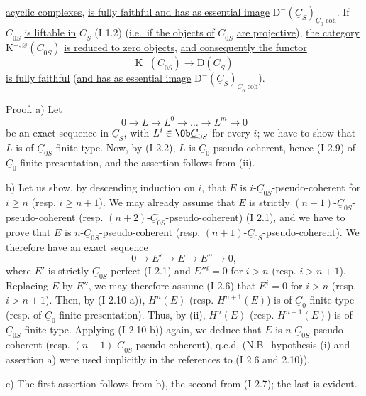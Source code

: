 \begin{enumerate}[label=\alph*)]
%
\uline{acyclic complexes}, \uline{is fully faithful and has as essential image} $\mathrm D^{-}(\underline{C}_S)_{\underline{C}_0\text{-coh}}$. If $\underline{C}_{0S}$ \uline{is liftable in} $\underline{C}_S$ (I 1.2) (\uline{i.e.\ if the objects of} $\underline{C}_{0S}$ \uline{are projective}), \uline{the category} $\mathrm K^{-,\varnothing}(\underline{C}_{0S})$ \uline{is reduced to zero objects}, \uline{and consequently the functor}
\[
\mathrm K^{-}(\underline{C}_{0S})\longrightarrow \mathrm D(\underline{C}_S)
\]
\uline{is fully faithful} (\uline{and has as essential image} $\mathrm D^{-}(\underline{C}_S)_{\underline{C}_0\text{-coh}}$).
\end{enumerate}

\uline{Proof.} a) Let
\[
0\longrightarrow L\longrightarrow L^0\longrightarrow\ldots\longrightarrow L^m\longrightarrow0
\]
be an exact sequence in $\underline{C}_S$, with $L^i\in\Ob\underline{C}_{0S}$ for every $i$; we have to show that $L$ is of $\underline{C}_{0S}$-finite type. Now, by (I 2.2), $L$ is $\underline{C}_0$-pseudo-coherent, hence (I 2.9) of $\underline{C}_0$-finite presentation, and the assertion follows from (ii).

b) Let us show, by descending induction on $i$, that $E$ is $i$-$\underline{C}_{0S}$-pseudo-coherent for $i\ge n$ (resp. $i\ge n+1$). We may already assume that $E$ is strictly $(n+1)$-$\underline{C}_{0S}$-pseudo-coherent (resp. $(n+2)$-$\underline{C}_{0S}$-pseudo-coherent) (I 2.1), and we have to prove that $E$ is $n$-$\underline{C}_{0S}$-pseudo-coherent (resp. $(n+1)$-$\underline{C}_{0S}$-pseudo-coherent). We therefore have an exact sequence
\[
0\longrightarrow E'\longrightarrow E\longrightarrow E''\longrightarrow0,
\]
where $E'$ is strictly $\underline{C}_{0S}$-perfect (I 2.1) and $E''{}^i=0$ for $i>n$ (resp. $i>n+1$). Replacing $E$ by $E''$, we may therefore assume (I 2.6) that $E^i=0$ for $i>n$ (resp. $i>n+1$). Then, by (I 2.10 a)), $H^n(E)$ (resp. $H^{n+1}(E)$) is of $\underline{C}_0$-finite type (resp. of $\underline{C}_0$-finite presentation). Thus, by (ii), $H^n(E)$ (resp. $H^{n+1}(E)$) is of $\underline{C}_{0S}$-finite type. Applying (I 2.10 b)) again, we deduce that $E$ is $n$-$\underline{C}_{0S}$-pseudo-coherent (resp. $(n+1)$-$\underline{C}_{0S}$-pseudo-coherent), q.e.d. (N.B.\ hypothesis (i) and assertion a) were used implicitly in the references to (I 2.6 and 2.10)).

c) The first assertion follows from b), the second from (I 2.7); the last is evident.

